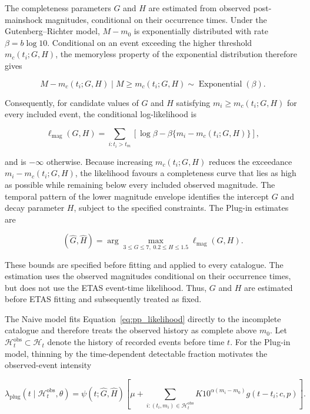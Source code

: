 \documentclass{statsmsc}
\begin{document}
The completeness parameters \(G\) and \(H\) are estimated from observed
post-mainshock magnitudes, conditional on their occurrence times. Under the
Gutenberg--Richter model, \(M-m_0\) is exponentially distributed with rate
\(\beta=b\log 10\). Conditional on an event exceeding the higher threshold
\(m_c(t_i;G,H)\), the memoryless property of the exponential distribution
therefore gives

\[
M-m_c(t_i;G,H)
\mid M\geq m_c(t_i;G,H)
\sim \operatorname{Exponential}(\beta).
\]

Consequently, for candidate values of \(G\) and \(H\) satisfying
\(m_i\geq m_c(t_i;G,H)\) for every included event, the conditional
log-likelihood is

\begin{equation}
\ell_{\mathrm{mag}}(G,H)
=
\sum_{i:t_i>t_m}
\left[
\log\beta-\beta\{m_i-m_c(t_i;G,H)\}
\right],
\label{eq:gh_likelihood}
\end{equation}

and is \(-\infty\) otherwise. Because increasing \(m_c(t_i;G,H)\) reduces the
exceedance \(m_i-m_c(t_i;G,H)\), the likelihood favours a completeness curve
that lies as high as possible while remaining below every included observed
magnitude. The temporal pattern of the lower magnitude envelope identifies
the intercept \(G\) and decay parameter \(H\), subject to the specified
constraints. The Plug-in estimates are

\[
(\widehat G,\widehat H)
=
\arg\max_{3\leq G\leq7,\;0.2\leq H\leq1.5}
\ell_{\mathrm{mag}}(G,H).
\]

These bounds are specified before fitting and applied to every catalogue. The
estimation uses the observed magnitudes conditional on their occurrence times,
but does not use the ETAS event-time likelihood. Thus, \(G\) and \(H\) are
estimated before ETAS fitting and subsequently treated as fixed.

The Naive model fits Equation~\eqref{eq:pp_likelihood} directly to the
incomplete catalogue and therefore treats the observed history as complete
above \(m_0\). Let
\(\mathcal H_t^{\mathrm{obs}}\subset\mathcal H_t\) denote the history of
recorded events before time \(t\). For the Plug-in model, thinning by the
time-dependent detectable fraction motivates the observed-event intensity

\begin{equation}
\lambda_{\mathrm{plug}}
(t\mid\mathcal H_t^{\mathrm{obs}},\theta)
=
\psi(t;\widehat G,\widehat H)
\left[
\mu+
\sum_{i:(t_i,m_i)\in\mathcal H_t^{\mathrm{obs}}}
K10^{\alpha(m_i-m_0)}
g(t-t_i;c,p)
\right].
\label{eq:plugin}
\end{equation}
\end{document}
